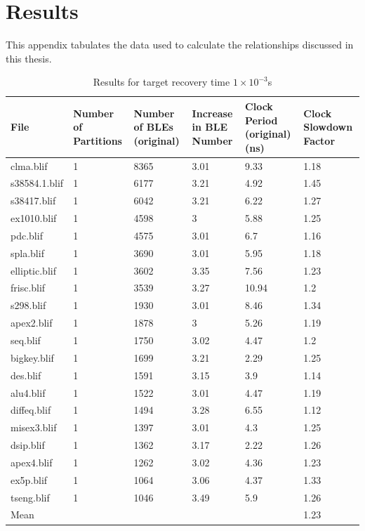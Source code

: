 \documentclass[12pt,final,oneside]{dwThesis} %
\begin{document}
   \appendix \chapter{Results} This appendix tabulates the data used to
   calculate the relationships discussed in this thesis.
   
      \begin{table} \footnotesize \begin{adjustwidth}{-1cm}{-1.2cm}
            \begin{tabularx}{1.1\textwidth}{XXXXXX} \toprule File & Number of
               Partitions &  Number of BLEs (original) &  Increase in BLE
               Number &  Clock Period (original) (ns) &  Clock Slowdown
               Factor\\ \midrule clma.blif & 1 & 8365 & 3.01 & 9.33 & 1.18\\
               s38584.1.blif & 1 & 6177 & 3.21 & 4.92 & 1.45\\ s38417.blif & 1
               & 6042 & 3.21 & 6.22 & 1.27\\ ex1010.blif & 1 & 4598 & 3 & 5.88
               & 1.25\\ pdc.blif & 1 & 4575 & 3.01 & 6.7 & 1.16\\ spla.blif & 1
               & 3690 & 3.01 & 5.95 & 1.18\\ elliptic.blif & 1 & 3602 & 3.35 &
               7.56 & 1.23\\ frisc.blif & 1 & 3539 & 3.27 & 10.94 & 1.2\\
               s298.blif & 1 & 1930 & 3.01 & 8.46 & 1.34\\ apex2.blif & 1 &
               1878 & 3 & 5.26 & 1.19\\ seq.blif & 1 & 1750 & 3.02 & 4.47 &
               1.2\\ bigkey.blif & 1 & 1699 & 3.21 & 2.29 & 1.25\\ des.blif & 1
               & 1591 & 3.15 & 3.9 & 1.14\\ alu4.blif & 1 & 1522 & 3.01 & 4.47
               & 1.19\\ diffeq.blif & 1 & 1494 & 3.28 & 6.55 & 1.12\\
               misex3.blif & 1 & 1397 & 3.01 & 4.3 & 1.25\\ dsip.blif & 1 &
               1362 & 3.17 & 2.22 & 1.26\\ apex4.blif & 1 & 1262 & 3.02 & 4.36
               & 1.23\\ ex5p.blif & 1 & 1064 & 3.06 & 4.37 & 1.33\\ tseng.blif
               & 1 & 1046 & 3.49 & 5.9 & 1.26\\ Mean &         &           &
               &          & 1.23\\ \bottomrule \end{tabularx} \caption{Results
               for target recovery time $1\times10^{-3}$s} \label{Results1e-3}
         \end{adjustwidth} \end{table}
   
\end{document}
